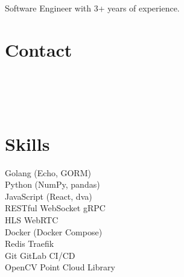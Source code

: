 \documentclass[]{deedy-resume}
\begin{document}
%
%
\lastupdated

%
%
{Software Engineer with 3+ years of experience.}

%
%
\begin{minipage}[t]{0.32\textwidth} 

\section{Contact}
{\parskip3pt
\href{mailto:devcchsu@gmail.com}{}\vspace{3pt} \\
\href{https://github.com/wuchihsu}{}\vspace{3pt} \\
\href{https://www.linkedin.com/in/wuchihsu}{}\vspace{3pt} \\
\href{https://goo.gl/maps/CGLqV6QWdAYszMuo9}{}
}
\sectionsep

\section{Skills}
\textbullet{} Golang (Echo, GORM)
\\\textbullet{} Python (NumPy, pandas)
\\\textbullet{} JavaScript (React, dva)
\\\textbullet{} RESTful \textbullet{} WebSocket \textbullet{} gRPC
\\\textbullet{} HLS \textbullet{} WebRTC
\\\textbullet{} Docker (Docker Compose)
\\\textbullet{} Redis \textbullet{} Traefik
\\\textbullet{} Git \textbullet{} GitLab CI/CD
\\\textbullet{} OpenCV \textbullet{} Point Cloud Library
\sectionsep


\end{minipage}
\end{document}
